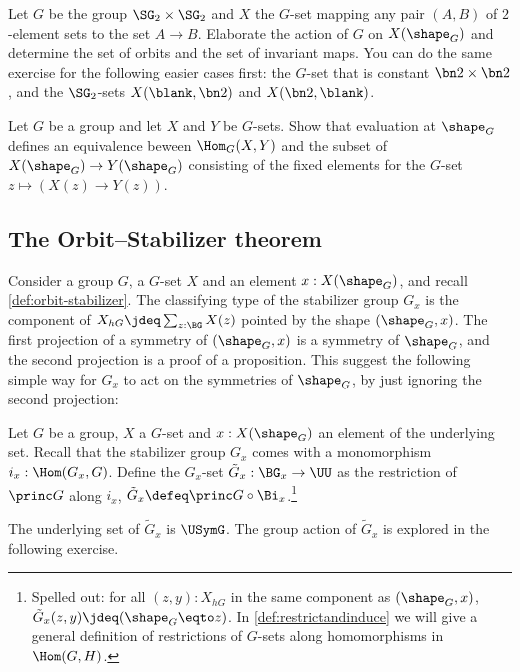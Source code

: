 \begin{xca}\label{xca:Gset-A->B}
Let $G$ be the group $\SG_2\times\SG_2$ and $X$ the $G$-set mapping
any pair $(A,B)$ of $2$-element sets to the set $A\to B$.
Elaborate the action of $G$ on $X(\sh_G)$ and determine the
set of orbits and the set of invariant maps. You can
do the same exercise for the following easier cases first:
the $G$-set that is constant $\bn2\times\bn2$, and
the $\SG_2$-sets $X(\blank,\bn2)$ and $X(\bn2,\blank)$.
\end{xca}

\begin{xca}\label{xca:HomGsets-ev}
Let $G$ be a group and let $X$ and $Y$ be $G$-sets.
Show that evaluation at $\sh_G$ defines an equivalence
beween $\Hom_G(X,Y)$ and the subset of $X(\sh_G)\to Y(\sh_G)$
consisting of the fixed elements for the $G$-set
$z\mapsto(X(z)\to Y(z))$.
\end{xca}

\subsection{The Orbit--Stabilizer theorem}
\label{sec:orbit-stabilizer-theorem}

Consider a group $G$, a $G$-set $X$ and an element $x:X(\sh_G)$,
and recall \cref{def:orbit-stabilizer}.
The classifying type of the stabilizer group $G_x$
is the component of $X_{hG}\jdeq\sum_{z:\BG} X(z)$ 
pointed by the shape $(\sh_G,x)$.
The first projection of a symmetry of $(\sh_G,x)$ is a symmetry of 
$\sh_G$, and the second projection is a proof of a proposition.
This suggest the following simple way for $G_x$ to act on the
symmetries of $\sh_G$, by just ignoring the second projection:


\begin{definition}\label{def:Gx-action-on-G}
  Let $G$ be a group, $X$ a $G$-set and $x:X(\sh_G)$ an element of the
  underlying set. Recall that the stabilizer group $G_x$ comes with a
  monomorphism $i_x : \Hom(G_x,G)$. Define the $G_x$-set
  $\tilde G_x : \BG_x \to \UU$ as the restriction of $\princ G$ along $i_x$, \ie
  $\tilde G_x \defeq \princ G \circ \Bi_x$.\footnote{%
    Spelled out: for all $(z,y):X_{hG}$ in the same component as $(\sh_G,x)$,
    $\tilde G_x(z,y)\jdeq(\sh_G\eqto z)$.  In \cref{def:restrictandinduce} we
    will give a general definition of restrictions of $G$-sets along
    homomorphisms in $\Hom(G,H)$.}
\end{definition} 

The underlying set of $\tilde G_x$ is $\USymG$. The group action of
$\tilde G_x$ is explored in the following exercise.

